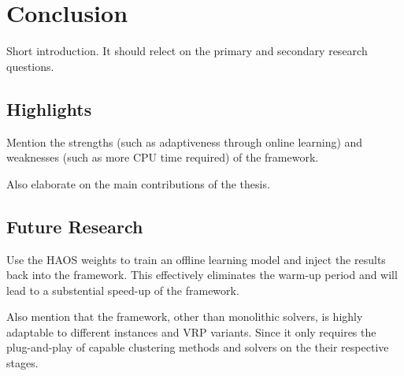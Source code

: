 \chapter{Conclusion}\label{chapter:conclusion}
Short introduction. It should relect on the primary and secondary research questions.

\section{Highlights}\label{sec:con-highlights}
Mention the strengths (such as adaptiveness through online learning) and weaknesses (such as more CPU time required) of the framework.

Also elaborate on the main contributions of the thesis.

\section{Future Research}\label{sec:con-future}
Use the HAOS weights to train an offline learning model and inject the results back into the framework. This effectively eliminates the warm-up period and will lead to a substential speed-up of the framework.

Also mention that the framework, other than monolithic solvers, is highly adaptable to different instances and VRP variants. Since it only requires the plug-and-play of capable clustering methods and solvers on the their respective stages.